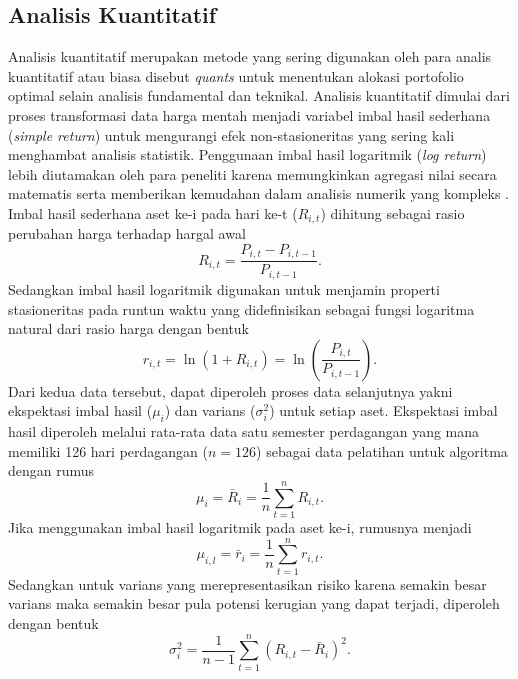 \subsection{Analisis Kuantitatif}
Analisis kuantitatif merupakan metode yang sering digunakan oleh para analis kuantitatif atau biasa disebut \textit{quants} untuk menentukan alokasi portofolio optimal selain analisis fundamental dan teknikal. Analisis kuantitatif dimulai dari proses transformasi data harga mentah menjadi variabel imbal hasil sederhana (\textit{simple return}) untuk mengurangi efek non-stasioneritas yang sering kali menghambat analisis statistik. Penggunaan imbal hasil logaritmik (\textit{log return}) lebih diutamakan oleh para peneliti karena memungkinkan agregasi nilai secara matematis serta memberikan kemudahan dalam analisis numerik yang kompleks \cite{saslow_economic_1999}. Imbal hasil sederhana aset ke-i pada hari ke-t  ($R_{i,t}$) dihitung sebagai rasio perubahan harga terhadap hargal awal
\begin{equation}
    R_{i,t} = \frac{P_{i,t} - P_{i,t-1}}{P_{i,t-1}}.
\end{equation}
Sedangkan imbal hasil logaritmik digunakan untuk menjamin properti stasioneritas pada runtun waktu yang didefinisikan sebagai fungsi logaritma natural dari rasio harga dengan bentuk
\begin{equation}
    r_{i,t} = \ln(1 + R_{i,t}) = \ln \left( \frac{P_{i,t}}{P_{i,t-1}} \right).
\end{equation}
Dari kedua data tersebut, dapat diperoleh proses data selanjutnya yakni ekspektasi imbal hasil ($\mu_i$) dan varians ($\sigma_i^2$) untuk setiap aset. Ekspektasi imbal hasil diperoleh melalui rata-rata data satu semester perdagangan yang mana memiliki 126 hari perdagangan ($n=126$) sebagai data pelatihan untuk algoritma dengan rumus
\begin{equation}
    \mu_i = \bar{R}_i = \frac{1}{n} \sum_{t=1}^n R_{i,t}.
\end{equation}
Jika menggunakan imbal hasil logaritmik pada aset ke-i, rumusnya menjadi
\begin{equation}
    \mu_{i,l} = \bar{r}_i = \frac{1}{n} \sum_{t=1}^n r_{i,t}.
\end{equation}
Sedangkan untuk varians yang merepresentasikan risiko karena semakin besar varians maka semakin besar pula potensi kerugian yang dapat terjadi, diperoleh dengan bentuk 
\begin{equation}
    \sigma_i^2 = \frac{1}{n-1} \sum_{t=1}^n (R_{i,t} - \bar{R}_i)^2.
\end{equation}
